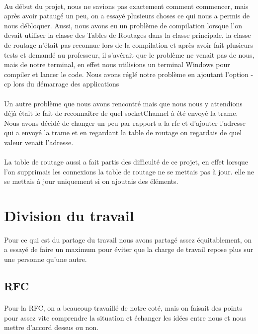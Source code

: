 \documentclass[a4paper,titlepage]{report}
\begin{document}
\paragraph{}
Au début du projet, nous ne savions pas exactement comment commencer, mais après avoir pataugé un peu, on a essayé plusieurs choses ce qui nous a permis  de nous débloquer.
Aussi, nous avons eu un problème de compilation lorsque l'on devait utiliser la classe des Tables de Routages dans la classe principale, la classe de routage n'était pas reconnue lors de la compilation et après avoir fait plusieurs tests et demandé au professeur, il s'avérait que le problème ne venait pas de nous, mais de notre terminal, en effet nous utilisions un terminal Windows pour compiler et lancer le code.
Nous avons réglé notre problème en ajoutant l'option -cp lors du démarrage des applications
\paragraph{}
Un autre problème que nous avons rencontré mais que nous nous y attendions déjà était le fait de reconnaître de quel socketChannel à été envoyé la trame.
\\Nous avons décidé de changer un peu par rapport a la rfc et d'ajouter l'adresse qui a envoyé la trame et en regardant la table de routage on regardais de quel valeur venait l'adresse.\\
\paragraph{}
La table de routage aussi a fait partis des difficulté de ce projet, en effet lorsque l'on supprimais les connexions la table de routage ne se mettais pas à jour. elle ne se mettais à jour uniquement si on ajoutais des éléments.
\section{Division du travail}
\paragraph{}
Pour ce qui est du partage du travail nous avons partagé assez équitablement, on a essayé de faire un maximum pour éviter que la charge de travail repose plus sur une personne qu'une autre.
\subsection{RFC}
\paragraph{}
Pour la RFC, on a beaucoup travaillé de notre coté, mais on faisait des points pour assez vite comprendre la situation et échanger les idées entre nous et nous mettre d'accord dessus ou non.
\end{document}
